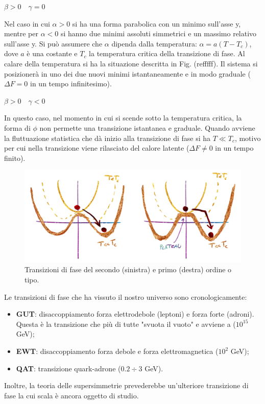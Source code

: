 \begin{example}
    $\beta > 0 \quad \gamma = 0 $
\end{example}
Nel caso in cui $\alpha >0$ si ha una forma parabolica con un minimo sull'asse y, mentre per  $\alpha <0$ si hanno due minimi assoluti simmetrici e un massimo relativo sull'asse y. Si può assumere che $\alpha$ dipenda dalla temperatura: $\alpha =a(T-T_c)$, dove $a$ è una costante e $T_c$ la temperatura critica della transizione di fase. Al calare della temperatura si ha la situazione descritta in Fig. (refffff). Il sistema si posizionerà in uno dei due nuovi minimi istantaneamente e in modo graduale ($\Delta F = 0$ in un tempo infinitesimo).

\begin{example}
    $\beta > 0 \quad \gamma < 0 $
\end{example}
In questo caso, nel momento in cui si scende sotto la temperatura critica, la forma di $\phi$ non permette una transizione istantanea e graduale. Quando avviene la fluttuazione statistica che dà inizio alla transizione di fase si ha $T \ll T_c$, motivo per cui nella transizione viene rilasciato del calore latente ($\Delta F \neq 0$ in un tempo finito).

\begin{figure}[h]
    \centering
    \includegraphics[width=.8\textwidth]{Pictures/4/transfase.png}
    \caption{Transizioni di fase del secondo (sinistra) e primo (destra) ordine o tipo.}
    \label{fig:4}
\end{figure}


\vspace{2em}
\noindent Le transizioni di fase che ha vissuto il nostro universo sono cronologicamente:
\begin{itemize}
    \item \textbf{GUT}: disaccoppiamento forza elettrodebole (leptoni) e forza forte (adroni). Questa è la transizione che più di tutte "svuota il vuoto" e avviene a ($10^{15 }$ GeV);
    \item \textbf{EWT}: disaccoppiamento forza debole e forza elettromagnetica ($10^{2}$ GeV);
    \item \textbf{QAT}: transizione quark-adrone ($0.2 \div 3$ GeV).
\end{itemize}
Inoltre, la teoria delle supersimmetrie prevederebbe un'ulteriore transizione di fase la cui scala è ancora oggetto di studio. 

